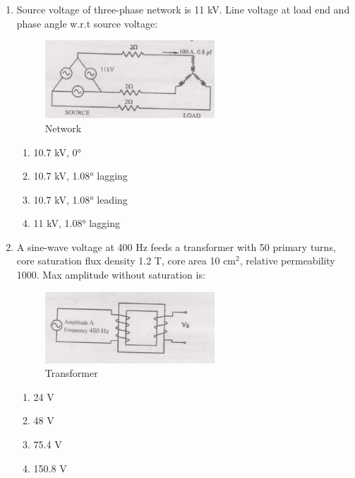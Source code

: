 \documentclass[journal,cmex10]{IEEEtran}
\theoremstyle{remark}
\numberwithin{equation}{enumi}
\numberwithin{figure}{enumi}
\begin{document}
\begin{enumerate}[label=\arabic*)]
    \item Source voltage of three-phase network is 11 kV. Line voltage at load end and phase angle w.r.t source voltage:
    \begin{figure}[htbp]
  \centering
  \includegraphics[width=0.6\textwidth]{figs/C/fig4.png}
  \caption{Network}
  \label{C/fig4.png}
\end{figure}
    
    \bigskip
    \hfill {}
    \begin{enumerate}[label=\alph*)]
        \item 10.7 kV, 0°
        \item 10.7 kV, 1.08° lagging
        \item 10.7 kV, 1.08° leading
        \item 11 kV, 1.08° lagging
    \end{enumerate}
    \bigskip

    \item A sine-wave voltage at 400 Hz feeds a transformer with 50 primary turns, core saturation flux density 1.2 T, core area 10 cm$^2$, relative permeability 1000. Max amplitude without saturation is:
    \begin{figure}[htbp]
  \centering
  \includegraphics[width=0.6\textwidth]{figs/C/fig5.png}
  \caption{Transformer}
  \label{C/fig5.png}
\end{figure}
    \bigskip
    \hfill {}
    \begin{enumerate}[label=\alph*)]
        \item 24 V
        \item 48 V
        \item 75.4 V
        \item 150.8 V
    \end{enumerate}
    \newpage


\end{enumerate}
\end{document}
